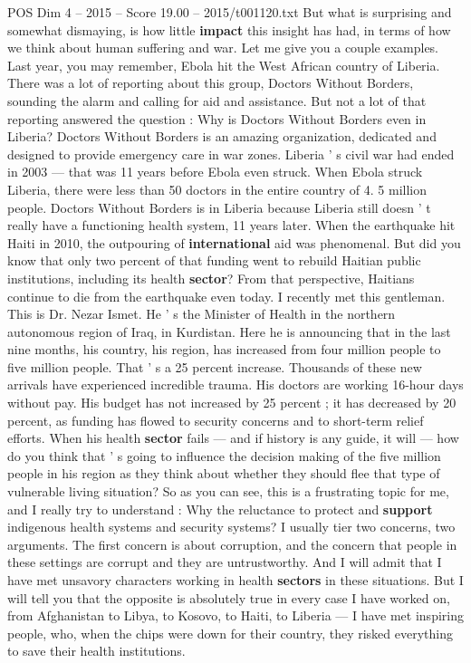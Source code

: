 \begin{textsample}{POS Dim 4 – 2015 – Score 19.00 – 2015/t001120.txt}
But what is surprising and somewhat dismaying, is how little \textbf{impact} this insight has had, in terms of how we think about human suffering and war.
Let me give you a couple examples.
Last year, you may remember, Ebola hit the West African country of Liberia.
There was a lot of reporting about this group, Doctors Without Borders, sounding the alarm and calling for aid and assistance.
But not a lot of that reporting answered the question : Why is Doctors Without Borders even in Liberia?
Doctors Without Borders is an amazing organization, dedicated and designed to provide emergency care in war zones.
Liberia ' s civil war had ended in 2003 — that was 11 years before Ebola even struck.
When Ebola struck Liberia, there were less than 50 doctors in the entire country of 4. 5 million people.
Doctors Without Borders is in Liberia because Liberia still doesn ' t really have a functioning health system, 11 years later.
When the earthquake hit Haiti in 2010, the outpouring of \textbf{international} aid was phenomenal.
But did you know that only two percent of that funding went to rebuild Haitian public institutions, including its health \textbf{sector}?
From that perspective, Haitians continue to die from the earthquake even today.
I recently met this gentleman.
This is Dr.
Nezar Ismet.
He ' s the Minister of Health in the northern autonomous region of Iraq, in Kurdistan.
Here he is announcing that in the last nine months, his country, his region, has increased from four million people to five million people.
That ' s a 25 percent increase.
Thousands of these new arrivals have experienced incredible trauma.
His doctors are working 16-hour days without pay.
His budget has not increased by 25 percent ; it has decreased by 20 percent, as funding has flowed to security concerns and to short-term relief efforts.
When his health \textbf{sector} fails — and if history is any guide, it will — how do you think that ' s going to influence the decision making of the five million people in his region as they think about whether they should flee that type of vulnerable living situation?
So as you can see, this is a frustrating topic for me, and I really try to understand : Why the reluctance to protect and \textbf{support} indigenous health systems and security systems?
I usually tier two concerns, two arguments.
The first concern is about corruption, and the concern that people in these settings are corrupt and they are untrustworthy.
And I will admit that I have met unsavory characters working in health \textbf{sectors} in these situations.
But I will tell you that the opposite is absolutely true in every case I have worked on, from Afghanistan to Libya, to Kosovo, to Haiti, to Liberia — I have met inspiring people, who, when the chips were down for their country, they risked everything to save their health institutions.

\end{textsample}
